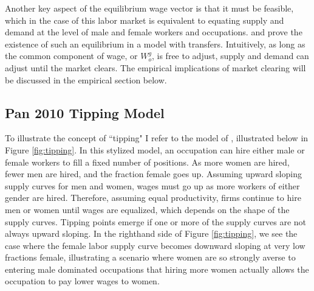 \documentclass[12pt]{article}
\begin{document}
Another key aspect of the equilibrium wage vector is that it must be feasible, which in the case of this labor market is equivalent to equating supply and demand at the level of male and female workers and occupations.  and  prove the existence of such an equilibrium in a model with transfers. Intuitively, as long as the common component of wage, or $W^g_o$, is free to adjust, supply and demand can adjust until the market clears. The empirical implications of market clearing will be discussed in the empirical section below.







\clearpage 
\newpage
\subsection{Pan 2010 Tipping Model}\label{sec.Pan}
To illustrate the concept of ``tipping" I refer to the model of , illustrated below in Figure \ref{fig:tipping}. In this stylized model, an occupation can hire either male or female workers to fill a fixed number of positions. As more women are hired, fewer men are hired, and the fraction female goes up. Assuming upward sloping supply curves for men and women, wages must go up as more workers of either gender are hired. Therefore, assuming equal productivity, firms continue to hire men or women until wages are equalized, which depends on the shape of the supply curves. Tipping points emerge if one or more of the supply curves are not always upward sloping. In the righthand side of Figure \ref{fig:tipping}, we see the case where the female labor supply curve becomes downward sloping at very low fractions female, illustrating a scenario where women are so strongly averse to entering male dominated occupations that hiring more women actually allows the occupation to pay lower wages to women.
\end{document}
